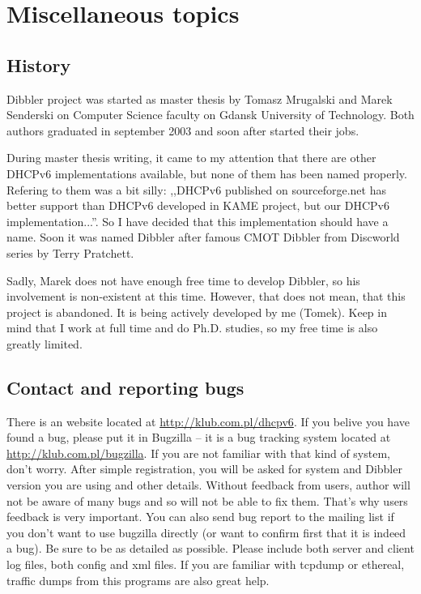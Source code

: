 
\newpage
\section{Miscellaneous topics}

\subsection{History}
Dibbler project was started as master thesis by Tomasz Mrugalski and
Marek Senderski on Computer Science faculty on Gdansk University of
Technology. Both authors graduated in september 2003 and soon after
started their jobs.

During master thesis writing, it came to my attention that there are
other DHCPv6 implementations available, but none of them has been
named properly. Refering to them was a bit
silly: ,,DHCPv6 published on sourceforge.net has better support than
DHCPv6 developed in KAME project, but our DHCPv6
implementation...''. So I have decided that this implementation should
have a name. Soon it was named Dibbler after famous CMOT
Dibbler from Discworld series by Terry Pratchett.

Sadly, Marek does not have enough free time to develop Dibbler, so his
involvement is non-existent at this time. However, that does not mean,
that this project is abandoned. It is being actively developed by
me (Tomek). Keep in mind that I work at full time and do
Ph.D. studies, so my free time is also greatly limited.

\hypertarget{contact}{}
\subsection{Contact and reporting bugs}
\label{contact}
There is an website located at \url{http://klub.com.pl/dhcpv6}. If you
belive you have found a bug, please put it in Bugzilla -- it is a bug
tracking system located at \url{http://klub.com.pl/bugzilla}. If you
are not familiar with that kind of system, don't worry. After simple
registration, you will be asked for system and Dibbler version you are
using and other details. Without feedback from users, author will not
be aware of many bugs and so will not be able to fix them. That's why
users feedback is very important. You can also send bug report to the
mailing list if you don't want to use bugzilla directly (or want to
confirm first that it is indeed a bug). Be sure to be as detailed as
possible. Please include both server and client log files, both config
and xml files. If you are familiar with tcpdump or ethereal, traffic
dumps from this programs are also great help.

